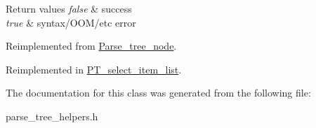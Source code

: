 \begin{DoxyRetVals}{Return values}
{\em false} & success \\
\hline
{\em true} & syntax/\+O\+O\+M/etc error \\
\hline
\end{DoxyRetVals}


Reimplemented from \mbox{\hyperlink{classParse__tree__node_a22d93524a537d0df652d7efa144f23da}{Parse\+\_\+tree\+\_\+node}}.



Reimplemented in \mbox{\hyperlink{classPT__select__item__list_a76b3fc28ad05e3c04a5d6223e8cbeade}{P\+T\+\_\+select\+\_\+item\+\_\+list}}.



The documentation for this class was generated from the following file\+:\begin{DoxyCompactItemize}
\item 
parse\+\_\+tree\+\_\+helpers.\+h\end{DoxyCompactItemize}
